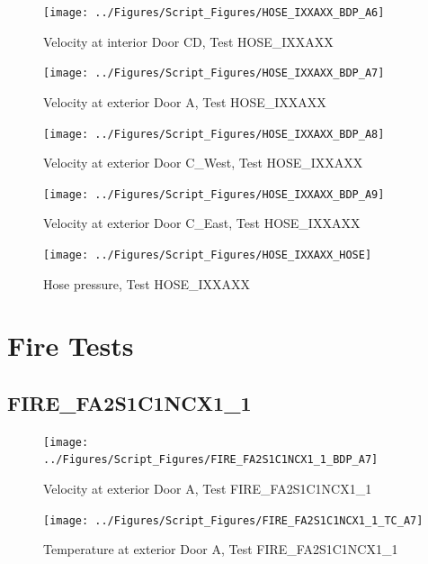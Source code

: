 \documentclass[12pt,oneside]{book}
\begin{document}
\begin{figure}[!ht]
\texttt{[image: ../Figures/Script\_Figures/HOSE\_IXXAXX\_BDP\_A6]}
\caption{Velocity at interior Door CD, Test HOSE\_IXXAXX}
\label{fig:HOSE_IXXAXX_BDP_A6}
\end{figure}

\begin{figure}[!ht]
\texttt{[image: ../Figures/Script\_Figures/HOSE\_IXXAXX\_BDP\_A7]}
\caption{Velocity at exterior Door A, Test HOSE\_IXXAXX}
\label{fig:HOSE_IXXAXX_BDP_A7}
\end{figure}

\begin{figure}[!ht]
\texttt{[image: ../Figures/Script\_Figures/HOSE\_IXXAXX\_BDP\_A8]}
\caption{Velocity at exterior Door C\_West, Test HOSE\_IXXAXX}
\label{fig:HOSE_IXXAXX_BDP_A8}
\end{figure}

\begin{figure}[!ht]
\texttt{[image: ../Figures/Script\_Figures/HOSE\_IXXAXX\_BDP\_A9]}
\caption{Velocity at exterior Door C\_East, Test HOSE\_IXXAXX}
\label{fig:HOSE_IXXAXX_BDP_A9}
\end{figure}

\begin{figure}[!ht]
\texttt{[image: ../Figures/Script\_Figures/HOSE\_IXXAXX\_HOSE]}
\caption{Hose pressure, Test HOSE\_IXXAXX}
\label{fig:HOSE_IXXAXX_HOSE}
\end{figure}


\clearpage


\section{Fire Tests}

\subsection{FIRE\_FA2S1C1NCX1\_1}

\begin{figure}[!ht]
\texttt{[image: ../Figures/Script\_Figures/FIRE\_FA2S1C1NCX1\_1\_BDP\_A7]}
\caption{Velocity at exterior Door A, Test FIRE\_FA2S1C1NCX1\_1}
\label{fig:FIRE_FA2S1C1NCX1_1_BDP_A7}
\end{figure}

\begin{figure}[!ht]
\texttt{[image: ../Figures/Script\_Figures/FIRE\_FA2S1C1NCX1\_1\_TC\_A7]}
\caption{Temperature at exterior Door A, Test FIRE\_FA2S1C1NCX1\_1}
\label{fig:FIRE_FA2S1C1NCX1_1_TC_A7}
\end{figure}
\end{document}
